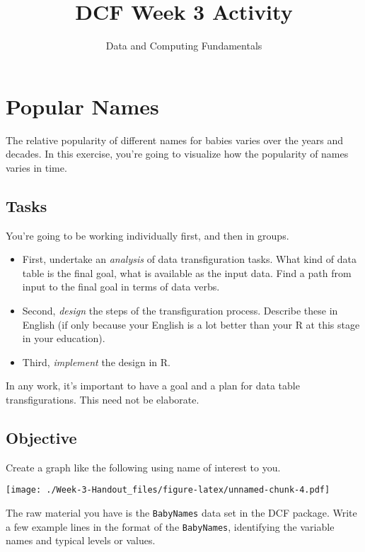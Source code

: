 \documentclass[]{article}
\title{DCF Week 3 Activity}
\author{}
\date{Data and Computing Fundamentals}
\begin{document}
\maketitle


\section{Popular Names}\label{popular-names}

The relative popularity of different names for babies varies over the
years and decades. In this exercise, you're going to visualize how the
popularity of names varies in time.

\subsection{Tasks}\label{tasks}

You're going to be working individually first, and then in groups.

\begin{itemize}
\itemsep1pt\parskip0pt
\item
  First, undertake an \emph{analysis} of data transfiguration tasks.
  What kind of data table is the final goal, what is available as the
  input data. Find a path from input to the final goal in terms of data
  verbs.
\item
  Second, \emph{design} the steps of the transfiguration process.
  Describe these in English (if only because your English is a lot
  better than your R at this stage in your education).
\item
  Third, \emph{implement} the design in R.
\end{itemize}

In any work, it's important to have a goal and a plan for data table
transfigurations. This need not be elaborate.

\subsection{Objective}\label{objective}

Create a graph like the following using name of interest to you.

\texttt{[image: ./Week-3-Handout\_files/figure-latex/unnamed-chunk-4.pdf]}

The raw material you have is the \texttt{BabyNames} data set in the DCF
package. Write a few example lines in the format of the
\texttt{BabyNames}, identifying the variable names and typical levels or
values.
\end{document}
